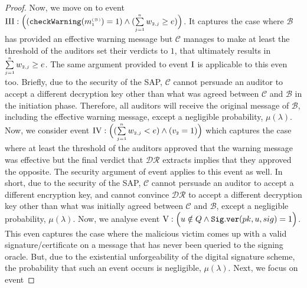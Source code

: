 \begin{proof}
 
 Now, we move on to event   $\text{\MakeUppercase{\romannumeral 3}}: \Big((\mathtt{checkWarning}(m^{\st\mathcal{(B)}}_{\st1})= 1) \wedge (\sum\limits_{\st j=1}^{\st n}w_{\st 2,j}\geq {e})\Big)$. It captures the case where $\mathcal{B}$ has provided an effective warning message but $\mathcal{C}$ manages to make at least the threshold of the auditors  set their verdicts to $1$, that ultimately results in $\sum\limits_{\scriptscriptstyle j=1}^{\scriptscriptstyle n}w_{\scriptscriptstyle 2,j}\geq e$. The same argument provided to event $\text{\MakeUppercase{\romannumeral 1}}$ is applicable to this even too. Briefly, due to the security of the SAP, $\mathcal{C}$ cannot persuade an auditor to accept a different decryption key other than what was agreed between $\mathcal{C}$ and $\mathcal{B}$ in the initiation phase. Therefore, all auditors will receive the original message of $\mathcal{B}$, including the effective warning message, except a negligible probability, $\mu(\lambda)$. Now, we consider  event $\text{\MakeUppercase{\romannumeral 4}}:  \Big((\sum\limits_{\st j=1}^{\st n}w_{\st 2,j}< {e}) \wedge ({v}_{\st 2}=1)\Big)$ which captures the case where at least the threshold of the auditors  approved that the warning message was effective but   the final verdict that $\mathcal{DR}$ extracts implies that they approved the opposite. The security argument of  event  applies to this event as well. In short, due to the security of the SAP, $\mathcal{C}$ cannot persuade  an auditor to accept a different encryption key, and cannot convince $\mathcal{DR}$ to accept a different decryption key other than what was initially agreed between $\mathcal{C}$ and $\mathcal{B}$, except a negligible probability, $\mu(\lambda)$. 
  Now, we analyse event  $\text{\MakeUppercase{\romannumeral 5}}: \Big(u\notin Q \wedge\mathtt{Sig.ver}( pk, u, sig) =1\Big)$. This even captures the case where the malicious victim comes up with a valid signature/certificate on a message that has never been queried to the signing oracle.  But, due to the existential unforgeability of the digital signature scheme, the probability that such an event occurs is negligible, $\mu(\lambda)$. Next, we focus on event

\end{proof}
